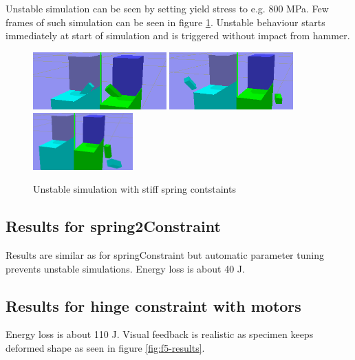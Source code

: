 Unstable simulation can be seen by setting yield stress to e.g. 800 MPa.
Few frames of such simulation can be seen in figure \ref{fig:f3-us-results}.
Unstable behaviour starts immediately at start of simulation and is triggered without impact from hammer.
\begin{figure}[htb!]
\centering
\includegraphics[height=2.2cm]{figs/f2-18-01-us-1}
\includegraphics[height=2.2cm]{figs/f2-18-01-us-2}
\includegraphics[height=2.2cm]{figs/f2-18-01-us-3}
\caption{Unstable simulation with stiff spring contstaints}
\label{fig:f3-us-results}
\end{figure}


\subsection{Results for spring2Constraint}
Results are similar as for springConstraint but automatic parameter tuning prevents unstable simulations.
Energy loss is about 40 J.

\subsection{Results for hinge constraint with motors}
Energy loss is about 110 J.
Visual feedback is realistic as specimen keeps deformed shape as seen in figure \ref{fig:f5-results}.


